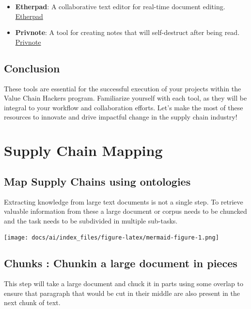 \documentclass[
  letterpaper,
  DIV=11,
  numbers=noendperiod]{scrreprt}
\begin{document}
\begin{itemize}
\item
  \textbf{Etherpad}: A collaborative text editor for real-time document
  editing. \href{https://etherpad.srv.viridis.info/}{Etherpad}
\item
  \textbf{Privnote}: A tool for creating notes that will self-destruct
  after being read. \href{https://privnote.srv.viridis.info/}{Privnote}
\end{itemize}

\section{Conclusion}\label{conclusion-3}

These tools are essential for the successful execution of your projects
within the Value Chain Hackers program. Familiarize yourself with each
tool, as they will be integral to your workflow and collaboration
efforts. Let's make the most of these resources to innovate and drive
impactful change in the supply chain industry!


\chapter{Supply Chain Mapping}\label{supply-chain-mapping}

\section{Map Supply Chains using
ontologies}\label{map-supply-chains-using-ontologies}

Extracting knowledge from large text documents is not a single step. To
retrieve valuable information from these a large document or corpus
needs to be chuncked and the task needs to be subdivided in multiple
sub-tasks.

\texttt{[image: docs/ai/index\_files/figure-latex/mermaid-figure-1.png]}

\section{Chunks : Chunkin a large document in
pieces}\label{chunks-chunkin-a-large-document-in-pieces}

This step will take a large document and chuck it in parts using some
overlap to ensure that paragraph that would be cut in their middle are
also present in the next chunk of text.
\end{document}
